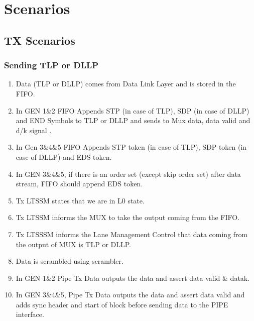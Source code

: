 \chapter{Scenarios}

\section{TX Scenarios}
\subsection{Sending TLP or DLLP}
\begin{enumerate}
\item Data (TLP or DLLP) comes from Data Link Layer and is stored in the FIFO.
\item In GEN 1\&2 FIFO Appends STP (in case of TLP), SDP (in case of DLLP) and END Symbols to TLP or DLLP and sends to Mux data, data valid and d/k signal .
\item In Gen 3\&4\&5 FIFO Appends STP token (in case of TLP), SDP token (in case of DLLP) and EDS token. 
\item In GEN 3\&4\&5, if there is an order set (except skip order set) after data stream, FIFO should append EDS token. 
\item Tx LTSSM states that we are in L0 state.
\item Tx LTSSM informs the MUX to take the output coming from the FIFO.
\item Tx LTSSSM informs the Lane Management Control that data coming from the output of MUX is TLP or DLLP.
\item Data is scrambled using scrambler.
\item In GEN 1\&2 Pipe Tx Data outputs the data and assert data valid \& datak. 
\item In GEN 3\&4\&5, Pipe Tx Data outputs the data and assert data valid and adds sync header and start of block before sending data to the PIPE interface.
\end{enumerate}
